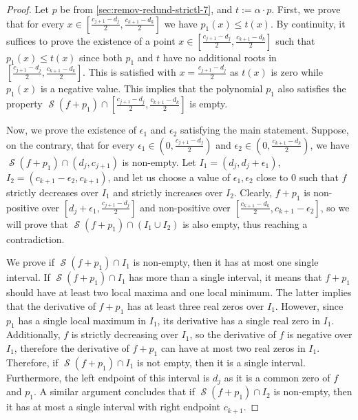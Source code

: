 \documentclass[preprint,12pt,authoryear]{elsarticle}
\newtheorem{proof}[theorem]{Proof}
\DeclareMathOperator{\semialgebraic}{\mathcal{S}}
\begin{document}
\begin{proof} 
  Let $p$ be from \th\ref{sec:remov-redund-strictl-7}, and
  $t := \alpha \cdot p$. First, we prove that for every
  $x \in [\frac{c_{j+1} - d_j}{2}, \frac{c_{k+1} - d_k}{2}]$ we have 
$p_1(x) \leq t(x)$. By continuity, it suffices to prove the existence of a
  point $x \in [\frac{c_{j+1} - d_j}{2}, \frac{c_{k+1} - d_k}{2}]$ such that
 $p_1(x) \leq t(x)$ since both $p_1$ and $t$ have no additional roots in
  $[\frac{c_{j+1} - d_j}{2}, \frac{c_{k+1} - d_k}{2}]$. This is satisfied with
  $x = \frac{c_{j+1} - d_j}{2}$ as $t(x)$ is zero while $p_1(x)$ is a negative
  value. This implies that the polynomial $p_1$ also satisfies the property
  $\semialgebraic(f + p_1) \cap [\frac{c_{j+1} - d_j}{2}, \frac{c_{k+1} -
    d_k}{2}]$ is empty.

  Now, we prove the existence of $\epsilon_1$ and $\epsilon_2$ satisfying the
  main statement. Suppose, on the contrary, that for every
  $\epsilon_1 \in (0, \frac{c_{j+1} - d_j}{2})$ and
  $\epsilon_2 \in (0, \frac{c_{k+1} - d_k}{2})$, we have 
$\semialgebraic(f + p_1) \cap (d_j, c_{j+1})$ is non-empty. Let
  $I_1 = (d_j, d_j + \epsilon_1)$, $I_2 = (c_{k+1} - \epsilon_2, c_{k+1})$, and
  let us choose a value of $\epsilon_1, \epsilon_2$ close to $0$ such that
 $f$ strictly decreases over $I_1$ and strictly increases over
  $I_2$. Clearly, $f + p_1$ is non-positive over
  $[d_j + \epsilon_1, \frac{c_{j+1} - d_j}{2}]$ and non-positive over
  $[\frac{c_{k+1} - d_k}{2}, c_{k+1} - \epsilon_2]$, so we will prove that
  $\semialgebraic(f + p_1) \cap (I_1 \cup I_2)$ is also empty, thus reaching a
  contradiction.

  We prove if $\semialgebraic(f + p_1) \cap I_1$ is non-empty, then it has at
  most one single interval. If $\semialgebraic(f + p_1) \cap I_1$ has more than
  a single interval, it means that $f + p_1$ should have at least two local
  maxima and one local minimum. The latter implies that the derivative of
  $f + p_1$ has at least three real zeros over $I_1$. However, since $p_1$ has a
  single local maximum in $I_1$, its derivative has a single real zero in
  $I_1$. Additionally, $f$ is strictly decreasing over $I_1$, so the derivative
  of $f$ is negative over $I_1$, therefore the derivative of $f + p_1$ can have at
  most two real zeros in $I_1$. Therefore, if $\semialgebraic(f + p_1) \cap I_1$
  is not empty, then it is a single interval. Furthermore, the left endpoint of
  this interval is $d_j$ as it is a common zero of $f$ and $p_1$. A similar
  argument concludes that if $\semialgebraic(f + p_1) \cap I_2$ is non-empty,
  then it has at most a single interval with right endpoint
  $c_{k+1}$.


\end{proof}
\end{document}
